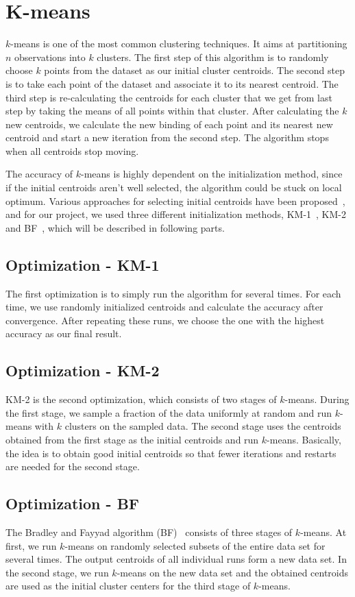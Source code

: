 \documentclass{acm_proc_article-sp}
\begin{document}
\section{K-means}
$k$-means is one of the most common clustering techniques. It aims at partitioning $n$ observations into $k$ clusters. The first step of this algorithm is to randomly choose $k$ points from the dataset as our initial cluster centroids. The second step is to take each point of the dataset and associate it to its nearest centroid. The third step is re-calculating the centroids for each cluster that we get from last step by taking the means of all points within that cluster. After calculating the $k$ new centroids, we calculate the new binding of each point and its nearest new centroid and start a new iteration from the second step. The algorithm stops when all centroids stop moving.

The accuracy of $k$-means is highly dependent on the initialization method, since if the initial centroids aren't well selected, the algorithm could be stuck on local optimum. Various approaches for selecting initial centroids have been proposed~\cite{kanungo2002efficient, arthur2007k, khan2004cluster}, and for our project, we used three different initialization methods, KM-1~\cite{hartigan1979algorithm}, KM-2~\cite{yan2009fast} and BF~\cite{bradley1998refining}, which will be described in following parts.

\subsection{Optimization - KM-1}
The first optimization is to simply run the algorithm for several times. For each time, we use randomly initialized centroids and calculate the accuracy after convergence. After repeating these runs, we choose the one with the highest accuracy as our final result.
\subsection{Optimization - KM-2}
KM-2 is the second optimization, which consists of two stages of $k$-means. During the first stage, we sample a fraction of the data uniformly at random and run $k$-means with $k$ clusters on the sampled data. The second stage uses the centroids obtained from the first stage as the initial centroids and run $k$-means. Basically, the idea is to obtain good initial centroids so that fewer iterations and restarts are needed for the second stage.
\subsection{Optimization - BF}
The Bradley and Fayyad algorithm (BF)~\cite{bradley1998refining} consists of three stages of $k$-means. At first, we run $k$-means on randomly selected subsets of the entire data set for several times. The output centroids of all individual runs form a new data set. In the second stage, we run $k$-means on the new data set and the obtained centroids are used as the initial cluster centers for the third stage of $k$-means.
\end{document}

